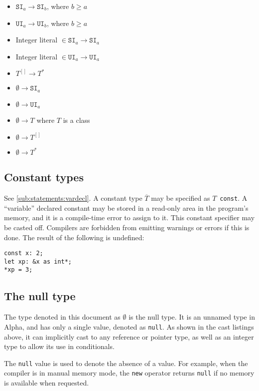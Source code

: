 \documentclass{article}
\newcommand{\R}[1]{\mathtt{#1}}
\begin{document}
\begin{itemize}
\item{$\R{SI}_a \to \R{SI}_b$, where $b \geq a$}
\item{$\R{UI}_a \to \R{UI}_b$, where $b \geq a$}
\item{Integer literal $\in \R{SI}_a \to \R{SI}_a$}
\item{Integer literal $\in \R{UI}_a \to \R{UI}_a$}
\item{$T^{[]} \to T^*$}
\item{$\emptyset \to \R{SI}_a$}
\item{$\emptyset \to \R{UI}_a$}
\item{$\emptyset \to T$ where $T$ is a class}
\item{$\emptyset \to T^{[]}$}
\item{$\emptyset \to T^*$}
\end{itemize}

\subsection{Constant types}
\label{sub:types:const}
See \ref{sub:statements:vardecl}.
A constant type $\overline{T}$ may be specified as $T$~\texttt{const}. A
``variable'' declared constant may be stored in a read-only area in the
program's memory, and it is a compile-time error to assign to it.
This constant specifier may be casted off. Compilers are forbidden from
emitting warnings or errors if this is done. The result of the following
is undefined:
\begin{verbatim}
const x: 2;
let xp: &x as int*;
*xp = 3;
\end{verbatim}

\subsection{The null type}
\label{sub:types:null}
The type denoted in this document as $\emptyset$ is the null type. It is an
unnamed type in Alpha, and has only a single value, denoted as
\texttt{null}. As shown in the cast listings above, it can implicitly cast
to any reference or pointer type, as well as an integer type to allow its use
in conditionals.

The \texttt{null} value is used to denote the absence of a value. For example,
when the compiler is in manual memory mode, the \texttt{new} operator returns
\texttt{null} if no memory is available when requested.
\end{document}
